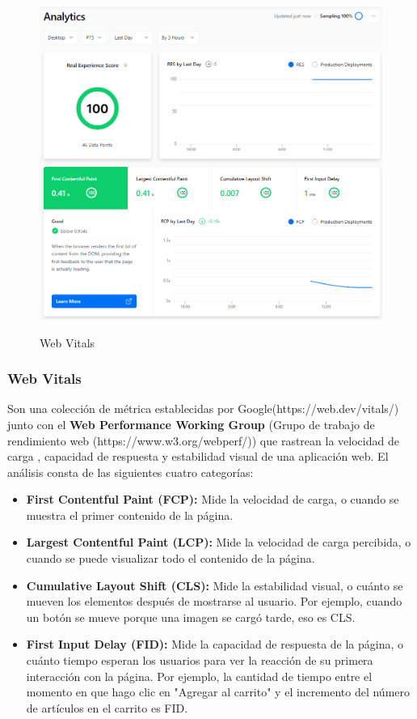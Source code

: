 \documentclass[12pt,twoside,titlepage]{report}
\begin{document}
\begin{figure}[H]
    \centering
    \includegraphics[scale=0.5]{Vercel/RealExperienceScore}
    \label{fig:Vercel_metrics}
    \caption{Web Vitals}
\end{figure}

\subsubsection{Web Vitals}

Son una colección de métrica establecidas por Google(https://web.dev/vitals/) junto con el \textbf{Web Performance Working Group}  (Grupo de trabajo de rendimiento web (https://www.w3.org/webperf/)) que rastrean la velocidad de carga , capacidad de respuesta y estabilidad visual de una aplicación web. El análisis consta de las siguientes cuatro categorías:

\begin{itemize}
    \item\textbf{First Contentful Paint (FCP):} Mide la velocidad de carga, o cuando se muestra el primer contenido de la página.
    \item\textbf{Largest Contentful Paint (LCP):} Mide la velocidad de carga percibida, o cuando se puede visualizar todo el contenido de la página.
    \item\textbf{Cumulative Layout Shift (CLS):} Mide la estabilidad visual, o cuánto se mueven los elementos después de mostrarse al usuario. Por ejemplo, cuando un botón se mueve porque una imagen se cargó tarde, eso es CLS.
    \item\textbf{First Input Delay (FID):} Mide la capacidad de respuesta de la página, o cuánto tiempo esperan los usuarios para ver la reacción de su primera interacción con la página. Por ejemplo, la cantidad de tiempo entre el momento en que hago clic en "Agregar al carrito" y el incremento del número de artículos en el carrito es FID.
\end{itemize}
\end{document}
